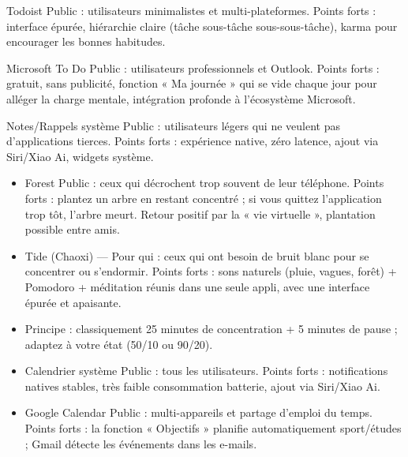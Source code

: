 Todoist Public : utilisateurs minimalistes et multi-plateformes. Points forts : interface épurée, hiérarchie claire (tâche sous-tâche sous-sous-tâche), karma pour encourager les bonnes habitudes.

Microsoft To Do Public : utilisateurs professionnels et Outlook. Points forts : gratuit, sans publicité, fonction « Ma journée » qui se vide chaque jour pour alléger la charge mentale, intégration profonde à l'écosystème Microsoft.

Notes/Rappels système Public : utilisateurs légers qui ne veulent pas d'applications tierces. Points forts : expérience native, zéro latence, ajout via Siri/Xiao Ai, widgets système.


\begin{itemize}
  \item Forest Public : ceux qui décrochent trop souvent de leur téléphone. Points forts : plantez un arbre en restant concentré ; si vous quittez l'application trop tôt, l'arbre meurt. Retour positif par la « vie virtuelle », plantation possible entre amis.
  \item Tide (Chaoxi) — Pour qui : ceux qui ont besoin de bruit blanc pour se concentrer ou s'endormir. Points forts : sons naturels (pluie, vagues, forêt) + Pomodoro + méditation réunis dans une seule appli, avec une interface épurée et apaisante.
  \item Principe : classiquement 25 minutes de concentration + 5 minutes de pause ; adaptez à votre état (50/10 ou 90/20).
\end{itemize}


\begin{itemize}
  \item Calendrier système Public : tous les utilisateurs. Points forts : notifications natives stables, très faible consommation batterie, ajout via Siri/Xiao Ai.
  \item Google Calendar Public : multi-appareils et partage d'emploi du temps. Points forts : la fonction « Objectifs » planifie automatiquement sport/études ; Gmail détecte les événements dans les e-mails.
\end{itemize}


